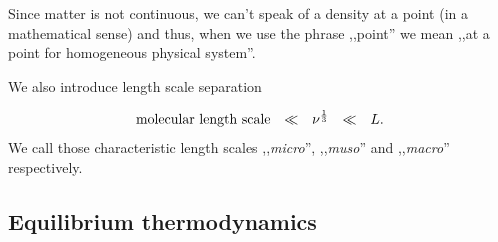 \documentclass[../main.tex]{subfiles}
\begin{document}
    Since matter is not continuous, we can't speak of a density at a point (in a mathematical sense) and
    thus, when we use the phrase ,,point'' we mean ,,at a point for homogeneous physical system''.

    We also introduce length scale separation %

    \begin{displaymath}
      \begin{matrix}
        \textrm{molecular length scale} & \ll & \nu^{\frac{1}{3}} & \ll & L.
      \end{matrix}
    \end{displaymath}
    We call those characteristic length scales ,,\emph{micro}'', ,,\emph{muso}'' and ,,\emph{macro}'' respectively.
    

    \subsection{Equilibrium thermodynamics}
\end{document}
